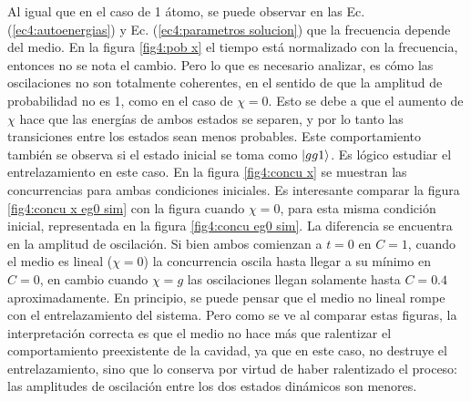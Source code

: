 Al igual que en el caso de 1 átomo, se puede observar en las Ec. (\ref{ec4:autoenergias}) y Ec. (\ref{ec4:parametros solucion}) que la frecuencia depende del medio. En la figura \ref{fig4:pob x} el tiempo está normalizado con la frecuencia, entonces no se nota el cambio. Pero lo que es necesario analizar, es cómo las oscilaciones no son totalmente coherentes, en el sentido de que la amplitud de probabilidad no es 1, como en el caso de $\chi=0$. Esto se debe a que el aumento de $\chi$ hace que las energías de ambos estados se separen, y por lo tanto las transiciones entre los estados sean menos probables. Este comportamiento también se observa si el estado inicial se toma como $\ket{gg1}$. Es lógico estudiar el entrelazamiento en este caso. En la figura \ref{fig4:concu x} se muestran las concurrencias para ambas condiciones iniciales. Es interesante comparar la figura \ref{fig4:concu x eg0 sim} con la figura cuando $\chi=0$, para esta misma condición inicial, representada en la figura \ref{fig4:concu eg0 sim}. La diferencia se encuentra en la amplitud de oscilación. Si bien ambos comienzan a $t=0$ en $C=1$, cuando el medio es lineal ($\chi=0$) la concurrencia oscila hasta llegar a su mínimo en $C=0$, en cambio cuando $\chi=g$ las oscilaciones llegan solamente hasta $C=0.4$ aproximadamente. En principio, se puede pensar que el medio no lineal rompe con el entrelazamiento del sistema. Pero como se ve al comparar estas figuras, la interpretación correcta es que el medio no hace más que ralentizar el comportamiento preexistente de la cavidad, ya que en este caso, no destruye el entrelazamiento, sino que lo conserva por virtud de haber ralentizado el proceso: las amplitudes de oscilación entre los dos estados dinámicos son menores.
